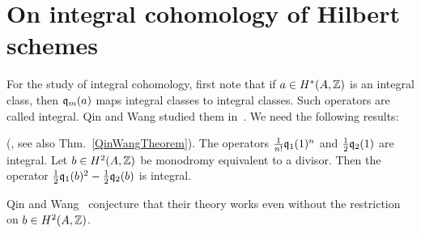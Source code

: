 

\section{On integral cohomology of Hilbert schemes}\label{basisHilb2}

For the study of integral cohomology, first note that if $a \in H^*(A,\mathbb{Z})$ is an integral class, then $\mathfrak{q}_{m}(a) $ maps integral classes to integral classes. Such operators are called integral. Qin and Wang studied them in~\cite{QinWang}. We need the following results:

\begin{lemma} (\cite{QinWang}\label{IntegralOperators}, see also Thm.~\ref{QinWangTheorem}).
The operators $\frac{1}{n!}\mathfrak{q}_1(1)^n$ and $\frac{1}{2}\mathfrak{q}_2(1) $ are integral.
Let $b\in H^2(A,\mathbb{Z})$ be monodromy equivalent to a divisor. Then the operator $\frac{1}{2}\mathfrak{q}_1(b)^2 - \frac{1}{2}\mathfrak{q}_2(b)$ is integral. 
\end{lemma}
\begin{remark}
Qin and Wang~\cite[Thm 1.1 et seq.]{QinWang} conjecture that their theory works even without the restriction on $b\in H^2(A,\mathbb{Z})$. 
\end{remark}

